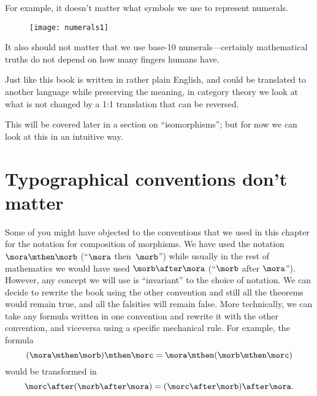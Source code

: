 For example, it doesn't matter what symbols we use to represent numerals.
% 
\begin{figure}[h!]
    \texttt{[image: numerals1]}
\end{figure}
% 
It also should not matter that we use base-10 numerals---certainly mathematical truths do not depend on how many fingers humans have.

Just like this book is written in rather plain English, and could be translated to another language while preserving the meaning, in category theory we look at what is not changed by a 1:1 translation that can be reversed.

This will be covered later in a section on ``isomorphisms''; but for now we can look at this in an intuitive way.

\section{Typographical conventions don't matter}

Some of you might have objected to the conventions that we used in this chapter for the notation for composition of morphisms.
We have used the notation $\mora \mthen \morb$ (``$\mora$ then~$\morb$'') while usually in the rest of mathematics we would have used $\morb \after \mora$ (``$\morb$ after $\mora$'').
However, any concept we will use is ``invariant'' to the choice of notation.
We can decide to rewrite the book using the other convention and still all the theorems would remain true, and all the falsities will remain false.
More technically, we can take any formula written in one convention and rewrite it with the other convention, and viceversa using a specific mechanical rule.
For example, the formula
%
\begin{equation*}
    (\mora \mthen \morb)
    \mthen \morc = \mora \mthen (\morb \mthen \morc)
\end{equation*}
%
would be transformed in
%
\begin{equation*}
    \morc \after (\morb \after \mora) = (\morc \after \morb) \after \mora.
\end{equation*}
%

